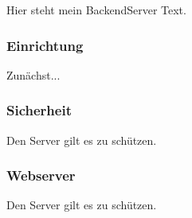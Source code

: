 Hier steht mein BackendServer Text.

\subsubsection{Einrichtung}
Zunächst...


\subsubsection{Sicherheit}
Den Server gilt es zu schützen.

\subsubsection{Webserver}
Den Server gilt es zu schützen.